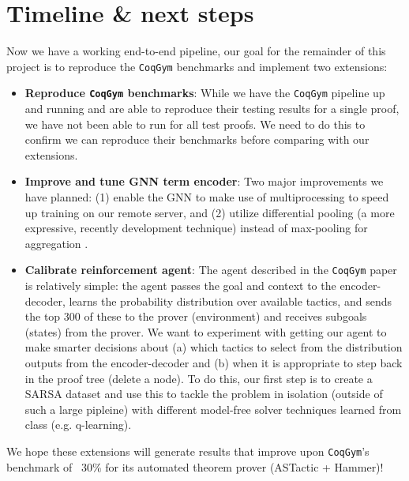 \documentclass{article}
\begin{document}
\section{Timeline \& next steps}
Now we have a working end-to-end pipeline, our goal for the remainder of this project is to reproduce the \texttt{CoqGym} benchmarks and implement two extensions:
\begin{itemize}
    \item \textbf{Reproduce \texttt{CoqGym} benchmarks}: While we have the \texttt{CoqGym} pipeline up and running and are able to reproduce their testing results for a single proof, we have not been able to run for all test proofs. We need to do this to confirm we can reproduce their benchmarks before comparing with our extensions.
    
    \item \textbf{Improve and tune GNN term encoder}: Two major improvements we have planned: (1) enable the GNN to make use of multiprocessing to speed up training on our remote server, and (2) utilize differential pooling (a more expressive, recently development technique) instead of max-pooling for aggregation \cite{hier}.
    
    \item \textbf{Calibrate reinforcement agent}: The agent described in the \texttt{CoqGym} paper \cite{coqgym} is relatively simple: the agent passes the goal and context to the encoder-decoder, learns the probability distribution over available tactics, and sends the top 300 of these to the prover (environment) and receives subgoals (states) from the prover. We want to experiment with getting our agent to make smarter decisions about (a) which tactics to select from the distribution outputs from the encoder-decoder and (b) when it is appropriate to step back in the proof tree (delete a node). To do this, our first step is to create a SARSA dataset and use this to tackle the problem in isolation (outside of such a large pipleine) with different model-free solver techniques learned from class (e.g. q-learning).

\end{itemize}

We hope these extensions will generate results that improve upon \texttt{CoqGym}'s benchmark of ~30\% for its automated theorem prover (ASTactic + Hammer)!
\end{document}
